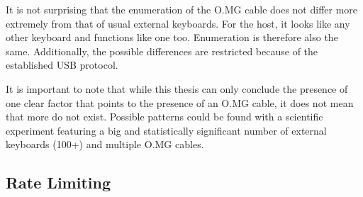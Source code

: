 It is not surprising that the enumeration of the O.MG cable does not differ more extremely from that of usual external keyboards. For the host, it looks like any other keyboard and functions like one too. Enumeration is therefore also the same. Additionally, the possible differences are restricted because of the established USB protocol.

It is important to note that while this thesis can only conclude the presence of one clear factor that points to the presence of an O.MG cable, it does not mean that more do not exist. Possible patterns could be found with a scientific experiment featuring a big and statistically significant number of external keyboards (100+) and multiple O.MG cables.

\subsection{Rate Limiting}

